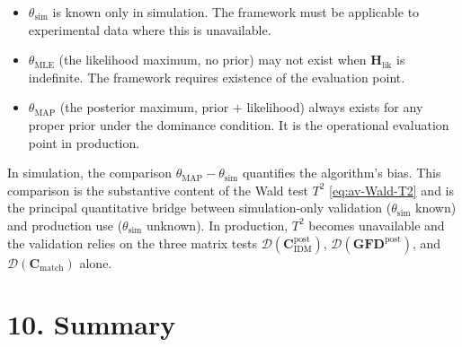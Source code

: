 \documentclass[11pt]{article}
\begin{document}
\begin{itemize}
\item $\theta_{\mathrm{sim}}$ is known only in simulation. The
  framework must be applicable to experimental data where this is
  unavailable.
\item $\theta_{\mathrm{MLE}}$ (the likelihood maximum, no prior) may
  not exist when $\mathbf H_{\mathrm{lik}}$ is indefinite. The
  framework requires existence of the evaluation point.
\item $\theta_{\mathrm{MAP}}$ (the posterior maximum, prior $+$
  likelihood) always exists for any proper prior under the dominance
  condition. It is the operational evaluation point in production.
\end{itemize}

In simulation, the comparison $\theta_{\mathrm{MAP}} - \theta_{\mathrm{sim}}$
quantifies the algorithm's bias. This comparison is the substantive
content of the Wald test $T^2$ \eqref{eq:av-Wald-T2} and is the principal
quantitative bridge between simulation-only validation
($\theta_{\mathrm{sim}}$ known) and production use ($\theta_{\mathrm{sim}}$
unknown). In production, $T^2$ becomes unavailable and the validation
relies on the three matrix tests
$\mathcal D(\mathbf C_{\mathrm{IDM}}^{\mathrm{post}})$,
$\mathcal D(\mathbf{GFD}^{\mathrm{post}})$, and
$\mathcal D(\mathbf C_{\mathrm{match}})$ alone.

\section*{10. Summary}
\label{sec:av-summary}
\end{document}
